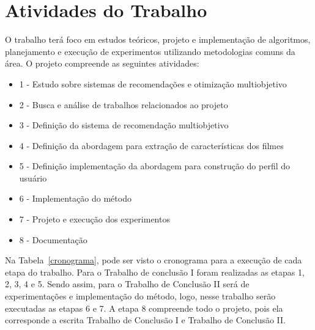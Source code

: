 \section{Atividades do Trabalho}
O trabalho terá foco em estudos teóricos, projeto e implementação de algoritmos, planejamento e execução de experimentos utilizando metodologias comuns da área.
O projeto compreende as seguintes atividades:
\begin{itemize}
    \item 1 - Estudo sobre sistemas de recomendações e otimização multiobjetivo
    \item 2 - Busca e análise de trabalhos relacionados ao projeto
    \item 3 - Definição do sistema de recomendação multiobjetivo
    \item 4 - Definição da abordagem para extração de características dos filmes
    \item 5 - Definição implementação da abordagem para construção do perfil do usuário
    \item 6 - Implementação do método
    \item 7 - Projeto e execução dos experimentos
    \item 8 - Documentação
\end{itemize}

Na Tabela~\ref{cronograma}, pode ser visto o cronograma para a execução de cada etapa do trabalho. Para o Trabalho de conclusão I foram realizadas as etapas 1, 2, 3, 4 e 5. Sendo assim, para o Trabalho de Conclusão II  será de experimentações e implementação do método, logo, nesse trabalho serão executadas as etapas 6 e 7. A etapa 8 compreende todo o projeto, pois ela corresponde a escrita Trabalho de Conclusão I e Trabalho de Conclusão II.

